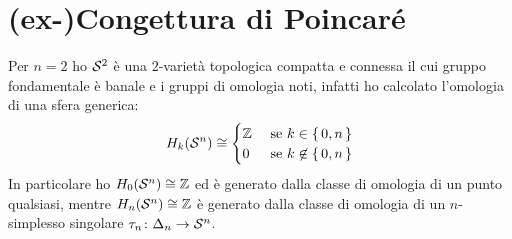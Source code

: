 




\section{(ex-)Congettura di Poincaré}

Per $ n = 2 $ ho $ \mathcal{S}^{2} $ è una $ 2 $-varietà topologica compatta e connessa
il cui gruppo fondamentale è banale e i gruppi di omologia noti, infatti ho
calcolato l'omologia di una sfera generica:
\[
  H_k(\mathcal{S}^{n}) \cong
  \begin{cases}
    \mathbb{Z} & \text{ se } k \in \set{0,n} \\
    0 & \text{ se } k \not \in \set{0,n}
  \end{cases}
\]
In particolare ho $ H_0(\mathcal{S}^{n}) \cong \mathbb{Z} $ ed è generato dalla classe di
omologia di un punto qualsiasi, mentre $ H_n(\mathcal{S}^{n}) \cong \mathbb{Z} $ è generato dalla
classe di omologia di un $ n $-simplesso singolare $ \tau_n \colon \Delta_n \to \mathcal{S}^{n} $.

